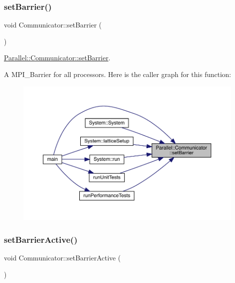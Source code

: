 \subsubsection{\texorpdfstring{setBarrier()}{setBarrier()}}
{\footnotesize\ttfamily void Communicator\+::set\+Barrier (\begin{DoxyParamCaption}{ }\end{DoxyParamCaption})\hspace{0.3cm}{\ttfamily [static]}}



\mbox{\hyperlink{class_parallel_1_1_communicator_a14aa3d54f5efe28094df886948e3dee2}{Parallel\+::\+Communicator\+::set\+Barrier}}. 

A M\+P\+I\+\_\+\+Barrier for all processors. Here is the caller graph for this function\+:
\nopagebreak
\begin{figure}[H]
\begin{center}
\leavevmode
\includegraphics[width=350pt]{class_parallel_1_1_communicator_a14aa3d54f5efe28094df886948e3dee2_icgraph}
\end{center}
\end{figure}
\mbox{\label{class_parallel_1_1_communicator_af61a4b8a49509982ae96d2a99dfb9f49}} 
\subsubsection{\texorpdfstring{setBarrierActive()}{setBarrierActive()}}
{\footnotesize\ttfamily void Communicator\+::set\+Barrier\+Active (\begin{DoxyParamCaption}{ }\end{DoxyParamCaption})\hspace{0.3cm}{\ttfamily [static]}}



